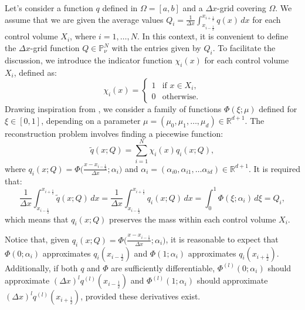 Let's consider a function ${q}$ defined in $\Omega=[a,b]$ and a $\Delta x$-grid covering $\Omega$. 
We assume that we are given the average values ${Q}_i = \frac{1}{\Delta x} \int_{x_{i-\frac{1}{2}}}^{x_{i+\frac{1}{2}}} {q}(x) \,dx$ 
for each control volume $X_i$, where $i = 1, \ldots, N$. 
In this context, it is convenient to define the $\Delta x$-grid function $Q\in \mathbb{P}^{N}_{\nu}$ with the entries given by $Q_i$.
To facilitate the discussion, we introduce the indicator function $\chi_{i}(x)$ for each control volume $X_i$, defined as:
\begin{equation*}
	\label{chp2-sec3-1-eq1}
	\chi_{i}(x)=
	\begin{cases}
		1 & \text{if } x \in X_i,\\
		0 & \text{otherwise.}
	\end{cases}
\end{equation*}
Drawing inspiration from \citet[Chapter~1]{stoer:2002}, we consider a family of functions $\Phi(\xi;\mu)$ 
defined for $\xi \in [0,1]$, depending on a parameter $\mu =(\mu_0, \mu_1,\ldots, \mu_d)\in \mathbb{R}^{d+1}$.
The reconstruction problem involves finding a piecewise function:
\begin{equation}
	\label{chp2-sec3-1-eq2}
	\tilde{q}(x;Q) = \sum_{i=1}^{N} \chi_i(x) q_i(x;Q),
\end{equation}
where $q_i(x;Q) = \Phi\big(\frac{x-x_{i-\frac{1}{2}}}{\Delta x};\alpha_i\big)$ and 
$\alpha_i= (\alpha_{i0},\alpha_{i1}, \ldots \alpha_{id})\in\mathbb{R}^{d+1}$. It is required that:
\begin{equation*}
	\frac{1}{\Delta x}\int_{x_{i-\frac{1}{2}}}^{x_{i+\frac{1}{2}}} \tilde{q}(x;Q) \,dx =
	\frac{1}{\Delta x}\int_{x_{i-\frac{1}{2}}}^{x_{i+\frac{1}{2}}} q_i(x;Q) \,dx =
	\int_{0}^{1} \Phi(\xi;\alpha_i) \,d\xi = {Q}_i,
\end{equation*}
which means that $q_i(x;Q)$ preserves the mass within each control volume $X_i$.

Notice that, given $q_i(x;Q) = \Phi\big(\frac{x-x_{i-\frac{1}{2}}}{\Delta x};\alpha_i\big)$, 
it is reasonable to expect that $\Phi(0;\alpha_i)$ approximates $q_i(x_{i-\frac{1}{2}})$ and
$\Phi(1;\alpha_i)$ approximates $q_i(x_{i+\frac{1}{2}})$. Additionally, if both $q$ and
$\Phi$ are sufficiently differentiable, $\Phi^{(l)}(0;\alpha_i)$ should approximate
$(\Delta x)^l q^{(l)}(x_{i-\frac{1}{2}})$ and $\Phi^{(l)}(1;\alpha_i)$ should
approximate $(\Delta x)^l q^{(l)}(x_{i+\frac{1}{2}})$, provided these derivatives exist.

